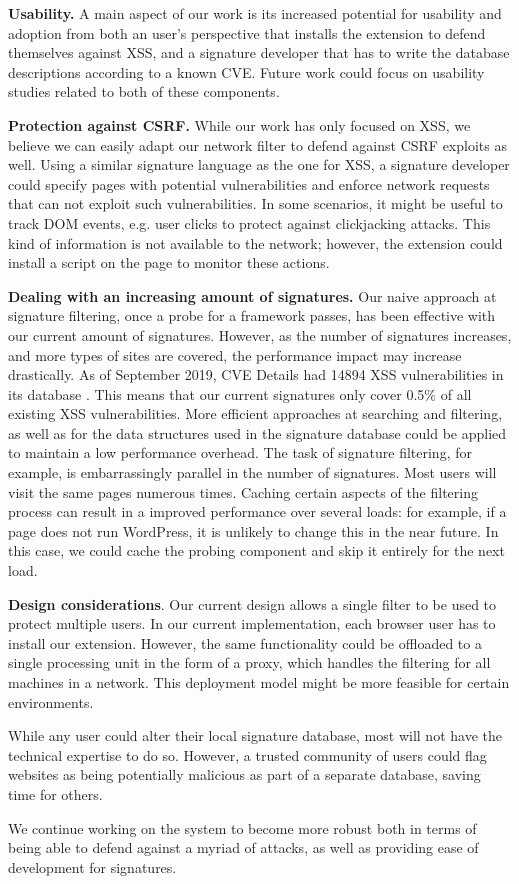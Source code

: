 \textbf{Usability.} A main aspect of our work is its increased potential for usability and adoption from both an user's perspective that installs the extension to defend themselves against XSS, and a signature developer that has to write the database descriptions according to a known CVE. Future work could focus on usability studies related to both of these components.

\textbf{Protection against CSRF.} While our work has only focused on XSS, we believe we can easily adapt our network filter to defend against CSRF exploits as well. Using a similar signature language as the one for XSS, a signature developer could specify pages with potential vulnerabilities and enforce network requests that can not exploit such vulnerabilities. In some scenarios, it might be useful to track DOM events, e.g. user clicks to protect against clickjacking attacks. This kind of information is not available to the network; however, the extension could install a script on the page to monitor these actions. 

\textbf{Dealing with an increasing amount of signatures.} Our naive approach at signature filtering, once a probe for a framework passes, has been effective with our current amount of signatures. However, as the number of signatures increases, and more types of sites are covered, the performance impact may increase drastically. As of September 2019, CVE Details had 14894 XSS vulnerabilities in its database \cite{vulnbytype}. This means that our current signatures only cover 0.5\% of all existing XSS vulnerabilities. More efficient approaches at searching and filtering, as well as for the data structures used in the signature database could be applied to maintain a low performance overhead. The task of signature filtering, for example, is embarrassingly parallel in the number of signatures. Most users will visit the same pages numerous times. Caching certain aspects of the filtering process can result in a improved performance over several loads: for example, if a page does not run WordPress, it is unlikely to change this in the near future. In this case, we could cache the probing component and skip it entirely for the next load.

\textbf{Design considerations}. Our current design allows a single filter to be used to protect multiple users. In our current implementation, each browser user has to install our extension. However, the same functionality could be offloaded to a single processing unit in the form of a proxy, which handles the filtering for all machines in a network. This deployment model might be more feasible for certain environments.

While any user could alter their local signature database, most will not have the technical expertise to do so. However, a trusted community of users could flag websites as being potentially malicious as part of a separate database, saving time for others. 

We continue working on the system to become more robust both in terms of being able to defend against a myriad of attacks, as well as providing ease of development for signatures. 
